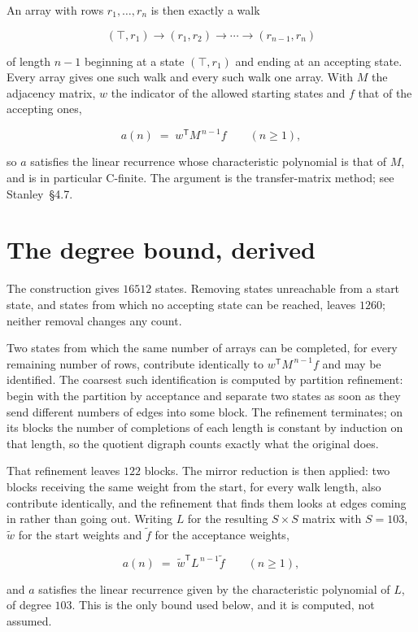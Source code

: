 \documentclass[11pt]{article}
\theoremstyle{definition}
\begin{document}
An array with rows $r_1,\dots,r_n$ is then exactly a walk

\[(\top,r_1) \to (r_1,r_2) \to \cdots \to (r_{n-1},r_n)\]

of length $n-1$ beginning at a state $(\top,r_1)$ and ending at an accepting state. Every array gives one such walk and every such walk one array. With $M$ the adjacency matrix, $w$ the indicator of the allowed starting states and $f$ that of the accepting ones,

\[a(n) \;=\; w^{\mathsf T} M^{\,n-1} f \qquad (n \ge 1),\]

so $a$ satisfies the linear recurrence whose characteristic polynomial is that of $M$, and is in particular C-finite. The argument is the transfer-matrix method; see Stanley~\S4.7.

\section{The degree bound, derived}

The construction gives $16512$ states. Removing states unreachable from a start state, and states from which no accepting state can be reached, leaves $1260$; neither removal changes any count.

Two states from which the same number of arrays can be completed, for every remaining number of rows, contribute identically to $w^{\mathsf T}M^{\,n-1}f$ and may be identified. The coarsest such identification is computed by partition refinement: begin with the partition by acceptance and separate two states as soon as they send different numbers of edges into some block. The refinement terminates; on its blocks the number of completions of each length is constant by induction on that length, so the quotient digraph counts exactly what the original does.

That refinement leaves $122$ blocks. The mirror reduction is then applied: two blocks receiving the same weight from the start, for every walk length, also contribute identically, and the refinement that finds them looks at edges coming in rather than going out. Writing $L$ for the resulting $S \times S$ matrix with $S = 103$, $\tilde w$ for the start weights and $\tilde f$ for the acceptance weights,

\[a(n) \;=\; \tilde w^{\mathsf T} L^{\,n-1} \tilde f \qquad (n \ge 1),\]

and $a$ satisfies the linear recurrence given by the characteristic polynomial of $L$, of degree $103$. This is the only bound used below, and it is computed, not assumed.
\end{document}
